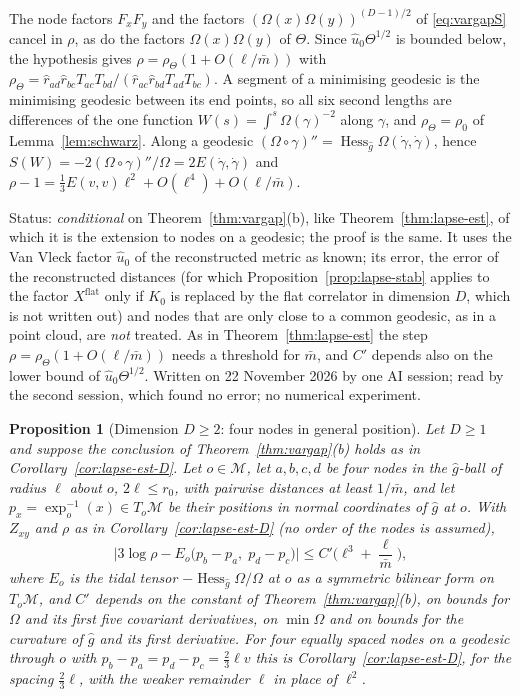 \documentclass[11pt,a4paper]{article}
\makeatletter
\theoremstyle{stmt}
\newtheorem{proposition}[theorem]{Proposition}
\theoremstyle{defn}
\theoremstyle{rmk}
\renewenvironment{proof}[1][\proofname]{\par\pushQED{\qed}\normalfont\topsep6\p@\@plus6\p@\relax
  \trivlist\item[\hskip\labelsep{\sffamily\itshape\small #1.}]\ignorespaces}{\popQED\endtrivlist\@endpefalse}
\numberwithin{equation}{section}
\newcommand{\status}[1]{\par\noindent\textsf{\small Status: #1}\par}
\newcommand{\M}{\mathcal{M}}
\makeatother
\begin{document}
{\begin{proof}
The node factors $F_xF_y$ and the factors $(\Omega(x)\Omega(y))^{(D-1)/2}$ of \eqref{eq:vargapS} cancel in $\rho$, as do the factors $\Omega(x)\Omega(y)$ of $\Theta$. Since $\hat u_0\Theta^{1/2}$ is bounded below, the hypothesis gives $\rho=\rho_\Theta(1+O(\ell/\bar m))$ with $\rho_\Theta=\hat r_{ad}\hat r_{bc}T_{ac}T_{bd}/(\hat r_{ac}\hat r_{bd}T_{ad}T_{bc})$. A segment of a minimising geodesic is the minimising geodesic between its end points, so all six second lengths are differences of the one function $W(s)=\int^s\Omega(\gamma)^{-2}$ along $\gamma$, and $\rho_\Theta=\rho_0$ of Lemma~\ref{lem:schwarz}. Along a geodesic $(\Omega\circ\gamma)''=\operatorname{Hess}_{\hat g}\Omega(\dot\gamma,\dot\gamma)$, hence $S(W)=-2(\Omega\circ\gamma)''/\Omega=2E(\dot\gamma,\dot\gamma)$ and $\rho-1=\frac13E(v,v)\ell^2+O(\ell^4)+O(\ell/\bar m)$.
\end{proof}
\status{\emph{conditional} on Theorem~\ref{thm:vargap}(b), like Theorem~\ref{thm:lapse-est}, of which it is the extension to nodes on a geodesic; the proof is the same. It uses the Van Vleck factor $\hat u_0$ of the reconstructed metric as known; its error, the error of the reconstructed distances (for which Proposition~\ref{prop:lapse-stab} applies to the factor $X^{\mathrm{flat}}$ only if $K_0$ is replaced by the flat correlator in dimension $D$, which is not written out) and nodes that are only close to a common geodesic, as in a point cloud, are \emph{not} treated. As in Theorem~\ref{thm:lapse-est} the step $\rho=\rho_\Theta(1+O(\ell/\bar m))$ needs a threshold for $\bar m$, and $C'$ depends also on the lower bound of $\hat u_0\Theta^{1/2}$. Written on 22 November 2026 by one AI session; read by the second session, which found no error; no numerical experiment.}

\begin{proposition}[Dimension $D\ge2$: four nodes in general position]\label{prop:lapse-cloud}
Let $D\ge1$ and suppose the conclusion of Theorem~\ref{thm:vargap}(b) holds as in Corollary~\ref{cor:lapse-est-D}. Let $o\in\M$, let $a,b,c,d$ be four nodes in the $\hat g$-ball of radius $\ell$ about $o$, $2\ell\le r_0$, with pairwise distances at least $1/\bar m$, and let $p_x=\exp_o^{-1}(x)\in T_o\M$ be their positions in normal coordinates of $\hat g$ at $o$. With $Z_{xy}$ and $\rho$ as in Corollary~\ref{cor:lapse-est-D} (no order of the nodes is assumed),
\[
\Big|3\log\rho-E_o\big(p_b-p_a,\;p_d-p_c\big)\Big|\le C'\Big(\ell^3+\frac{\ell}{\bar m}\Big),
\]
where $E_o$ is the tidal tensor $-\operatorname{Hess}_{\hat g}\Omega/\Omega$ at $o$ as a symmetric bilinear form on $T_o\M$, and $C'$ depends on the constant of Theorem~\ref{thm:vargap}(b), on bounds for $\Omega$ and its first five covariant derivatives, on $\min\Omega$ and on bounds for the curvature of $\hat g$ and its first derivative. For four equally spaced nodes on a geodesic through $o$ with $p_b-p_a=p_d-p_c=\tfrac23\ell v$ this is Corollary~\ref{cor:lapse-est-D}, for the spacing $\tfrac23\ell$, with the weaker remainder $\ell$ in place of $\ell^2$.
\end{proposition}

}
\end{document}
